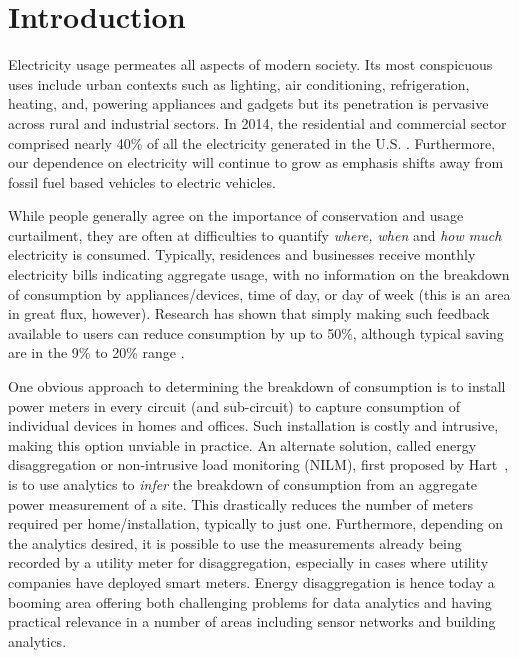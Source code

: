 \chapter{Introduction}

Electricity usage permeates all aspects of modern society.
Its most conspicuous
uses include urban contexts such as
lighting, air conditioning, refrigeration, heating, and, powering
appliances and gadgets but its penetration is pervasive across rural
and industrial sectors.
In 2014, the residential and commercial sector
comprised nearly 40\% of all the electricity generated in the U.S. \cite{book2014us}.
Furthermore, our dependence on electricity will continue to grow
as emphasis shifts away from fossil fuel based vehicles to electric
vehicles.

While people generally agree on the importance of conservation and
usage curtailment, they are often at difficulties to quantify 
{\em where, when} and {\em how much} electricity is consumed.
Typically, residences and businesses receive
monthly electricity bills indicating aggregate usage, with no information on
the breakdown of consumption by appliances/devices, time of day, or day of
week (this is an area in great flux, however). Research has 
shown that simply making such feedback available to users
can reduce consumption by up to 50\%, although typical saving 
are in the 9\% to 20\% range \cite{book2014us}.%

One obvious approach to determining the breakdown of consumption is to install
power meters in every circuit (and sub-circuit)
to capture consumption of individual devices in homes and
offices. Such installation is costly and intrusive, making 
this option unviable in practice. 
An alternate
solution, called energy disaggregation or non-intrusive load monitoring
(NILM),
first proposed by Hart~\cite{hart1992}, is to use analytics to 
{\em infer} the breakdown of consumption from an aggregate 
power measurement of a
site. This drastically reduces the number of meters required per 
home/installation, typically to just one. Furthermore, depending on the analytics desired, it is possible to
use the measurements already being recorded by a utility meter for
disaggregation, especially in cases where utility companies have deployed
smart meters.
Energy disaggregation is hence today a booming area offering both
challenging problems for data analytics and having practical relevance in a
number of areas including sensor networks and building analytics.

